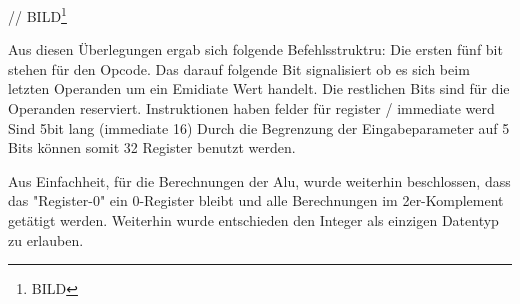 \documentclass[paper=a4,fontsize=12pt,twocolumn]{scrreprt}
\begin{document}
// BILD\footnote{BILD}

Aus diesen Überlegungen ergab sich folgende Befehlsstruktru: Die ersten fünf bit stehen für den Opcode.
Das darauf folgende Bit signalisiert ob es sich beim letzten Operanden um ein Emidiate Wert handelt.
Die restlichen Bits sind für die Operanden reserviert.
Instruktionen haben felder für register / immediate werd
Sind 5bit lang (immediate 16)
Durch die Begrenzung der Eingabeparameter auf 5 Bits können somit 32 Register benutzt werden.

Aus Einfachheit, für die Berechnungen der Alu, wurde weiterhin beschlossen, dass das "Register-0" ein 0-Register bleibt und alle Berechnungen im 2er-Komplement getätigt werden.
Weiterhin wurde entschieden den Integer als einzigen Datentyp zu erlauben.



\end{document}
